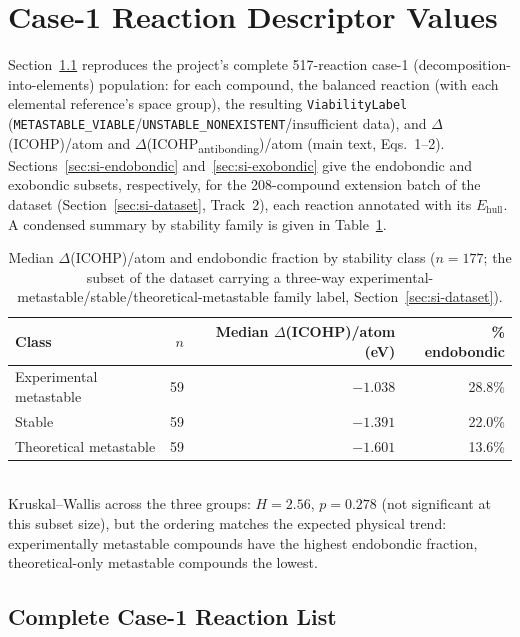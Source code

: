 \documentclass[11pt]{article}
\begin{document}
\section{Case-1 Reaction Descriptor Values}
\label{sec:si-reactions}

Section~\ref{sec:si-full-reactions} reproduces the project's complete
517-reaction case-1 (decomposition-into-elements) population: for each
compound, the balanced reaction (with each elemental reference's space
group), the resulting \texttt{ViabilityLabel}
(\texttt{METASTABLE\_VIABLE}/\texttt{UNSTABLE\_NONEXISTENT}/insufficient
data), and $\Delta$(ICOHP)/atom and $\Delta$(ICOHP\textsubscript{antibonding})/atom
(main text, Eqs.~1--2). Sections~\ref{sec:si-endobondic}
and~\ref{sec:si-exobondic} give the endobondic and exobondic subsets,
respectively, for the 208-compound extension batch of the dataset
(Section~\ref{sec:si-dataset}, Track~2), each reaction annotated with its
$E_\text{hull}$. A condensed summary by stability family is given in
Table~\ref{tab:si-family-breakdown}.

\begin{table}[htbp]
\centering
\caption{Median $\Delta$(ICOHP)/atom and endobondic fraction by stability
class ($n=177$; the subset of the dataset carrying a three-way
experimental-metastable/stable/theoretical-metastable family label,
Section~\ref{sec:si-dataset}).}
\label{tab:si-family-breakdown}
\begin{tabular}{@{}lrrr@{}}
\toprule
Class & $n$ & Median $\Delta$(ICOHP)/atom (eV) & \% endobondic \\
\midrule
Experimental metastable & 59 & $-1.038$ & 28.8\% \\
Stable                  & 59 & $-1.391$ & 22.0\% \\
Theoretical metastable  & 59 & $-1.601$ & 13.6\% \\
\bottomrule
\end{tabular}
\vspace{0.15cm}
\\{\footnotesize Kruskal--Wallis across the three groups: $H=2.56$,
$p=0.278$ (not significant at this subset size), but the ordering matches
the expected physical trend: experimentally metastable compounds have the
highest endobondic fraction, theoretical-only metastable compounds the
lowest.}
\end{table}

\subsection{Complete Case-1 Reaction List}
\label{sec:si-full-reactions}
{\footnotesize

}
\end{document}
